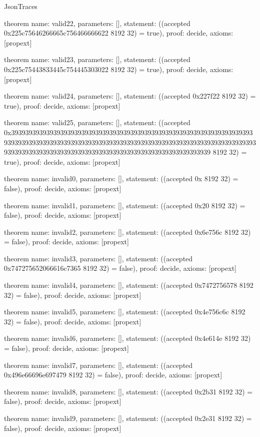 \begin{lexlean}{JsonTraces}
\begin{semanticmodule}
theorem{
  name: valid22,
  parameters: [],
  statement: ((accepted 0x225c75646266665c756466666622 8192 32) = true),
  proof: decide{},
  axioms: [propext]
}

theorem{
  name: valid23,
  parameters: [],
  statement: ((accepted 0x225c75443833445c754445303022 8192 32) = true),
  proof: decide{},
  axioms: [propext]
}

theorem{
  name: valid24,
  parameters: [],
  statement: ((accepted 0x227f22 8192 32) = true),
  proof: decide{},
  axioms: [propext]
}

theorem{
  name: valid25,
  parameters: [],
  statement: ((accepted 0x39393939393939393939393939393939393939393939393939393939393939393939393939393939393939393939393939393939393939393939393939393939393939393939393939393939393939393939393939393939393939393939393939393939 8192 32) = true),
  proof: decide{},
  axioms: [propext]
}

theorem{
  name: invalid0,
  parameters: [],
  statement: ((accepted 0x 8192 32) = false),
  proof: decide{},
  axioms: [propext]
}

theorem{
  name: invalid1,
  parameters: [],
  statement: ((accepted 0x20 8192 32) = false),
  proof: decide{},
  axioms: [propext]
}

theorem{
  name: invalid2,
  parameters: [],
  statement: ((accepted 0x6e756c 8192 32) = false),
  proof: decide{},
  axioms: [propext]
}

theorem{
  name: invalid3,
  parameters: [],
  statement: ((accepted 0x747275652066616c7365 8192 32) = false),
  proof: decide{},
  axioms: [propext]
}

theorem{
  name: invalid4,
  parameters: [],
  statement: ((accepted 0x7472756578 8192 32) = false),
  proof: decide{},
  axioms: [propext]
}

theorem{
  name: invalid5,
  parameters: [],
  statement: ((accepted 0x4e756c6c 8192 32) = false),
  proof: decide{},
  axioms: [propext]
}

theorem{
  name: invalid6,
  parameters: [],
  statement: ((accepted 0x4e614e 8192 32) = false),
  proof: decide{},
  axioms: [propext]
}

theorem{
  name: invalid7,
  parameters: [],
  statement: ((accepted 0x496e66696e697479 8192 32) = false),
  proof: decide{},
  axioms: [propext]
}

theorem{
  name: invalid8,
  parameters: [],
  statement: ((accepted 0x2b31 8192 32) = false),
  proof: decide{},
  axioms: [propext]
}

theorem{
  name: invalid9,
  parameters: [],
  statement: ((accepted 0x2e31 8192 32) = false),
  proof: decide{},
  axioms: [propext]
}


\end{semanticmodule}
\end{lexlean}
